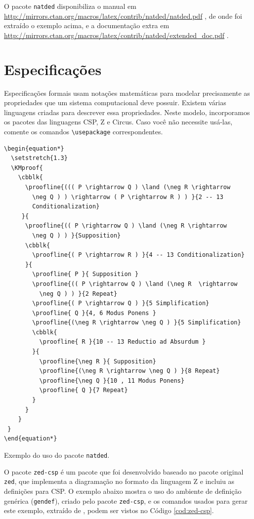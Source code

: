O pacote \texttt{natded} disponibiliza o manual em \url{http://mirrors.ctan.org/macros/latex/contrib/natded/natded.pdf} \parencite{natded}, de onde foi extraído o exemplo acima, e a documentação extra em \url{http://mirrors.ctan.org/macros/latex/contrib/natded/extended_doc.pdf} \parencite{natded-extra}.

\section{Especificações}

Especificações formais usam notações matemáticas para modelar precisamente as propriedades que um sistema computacional deve possuir. Existem várias linguagens criadas para descrever essa propriedades. Neste modelo, incorporamos os pacotes das linguagens CSP, Z e Circus. Caso você não necessite usá-las, comente os comandos \texttt{\textbackslash usepackage} correspondentes.
 
 \begin{listing}[ht]
 	\begin{verbatim}
\begin{equation*}
  \setstretch{1.3}
  \KMproof{
    \cbblk{
      \proofline{((( P \rightarrow Q ) \land (\neg R \rightarrow 
        \neg Q ) ) \rightarrow ( P \rightarrow R ) ) }{2 -- 13
        Conditionalization}
     }{
      \proofline{(( P \rightarrow Q ) \land (\neg R \rightarrow 
        \neg Q ) ) }{Supposition}
      \cbblk{
        \proofline{( P \rightarrow R ) }{4 -- 13 Conditionalization}
      }{
        \proofline{ P }{ Supposition }
        \proofline{(( P \rightarrow Q ) \land (\neg R  \rightarrow 
          \neg Q ) ) }{2 Repeat}
        \proofline{( P \rightarrow Q ) }{5 Simplification}
        \proofline{ Q }{4, 6 Modus Ponens }
        \proofline{(\neg R \rightarrow \neg Q ) }{5 Simplification}
        \cbblk{
          \proofline{ R }{10 -- 13 Reductio ad Absurdum }
        }{
          \proofline{\neg R }{ Supposition}
          \proofline{(\neg R \rightarrow \neg Q ) }{8 Repeat}
          \proofline{\neg Q }{10 , 11 Modus Ponens}
          \proofline{ Q }{7 Repeat}
        }
      }
    }
 }
\end{equation*}
 	\end{verbatim} 
 	\caption{Exemplo do uso do pacote \texttt{natded}.}
 	\label{cod:natded}
 \end{listing}

O pacote \texttt{zed-csp} é um pacote que foi desenvolvido baseado no pacote original \texttt{zed}, que implementa a diagramação no formato da linguagem Z e incluiu as definições para CSP. O exemplo abaixo mostra o uso do ambiente de definição genérica (\texttt{gendef}), criado pelo pacote \texttt{zed-csp}, e os comandos usados para gerar este exemplo, extraído de \parencite{zed}, podem ser vistos no Código \ref{cod:zed-csp}.
 
